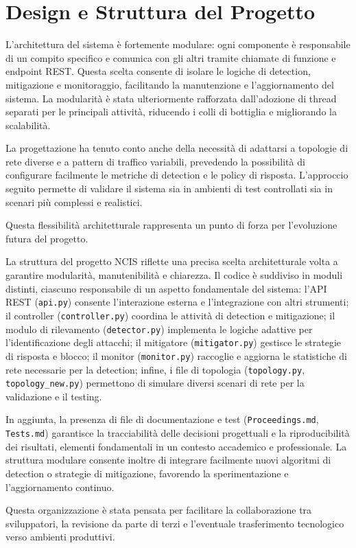 \section{Design e Struttura del Progetto}
L’architettura del sistema è fortemente modulare: ogni componente è responsabile di un compito specifico e comunica con gli altri tramite chiamate di funzione e endpoint REST. Questa scelta consente di isolare le logiche di detection, mitigazione e monitoraggio, facilitando la manutenzione e l’aggiornamento del sistema. La modularità è stata ulteriormente rafforzata dall’adozione di thread separati per le principali attività, riducendo i colli di bottiglia e migliorando la scalabilità.\par
La progettazione ha tenuto conto anche della necessità di adattarsi a topologie di rete diverse e a pattern di traffico variabili, prevedendo la possibilità di configurare facilmente le metriche di detection e le policy di risposta. L’approccio seguito permette di validare il sistema sia in ambienti di test controllati sia in scenari più complessi e realistici.\par
Questa flessibilità architetturale rappresenta un punto di forza per l’evoluzione futura del progetto.

La struttura del progetto NCIS riflette una precisa scelta architetturale volta a garantire modularità, manutenibilità e chiarezza. Il codice è suddiviso in moduli distinti, ciascuno responsabile di un aspetto fondamentale del sistema: l’API REST (\texttt{api.py}) consente l’interazione esterna e l’integrazione con altri strumenti; il controller (\texttt{controller.py}) coordina le attività di detection e mitigazione; il modulo di rilevamento (\texttt{detector.py}) implementa le logiche adattive per l’identificazione degli attacchi; il mitigatore (\texttt{mitigator.py}) gestisce le strategie di risposta e blocco; il monitor (\texttt{monitor.py}) raccoglie e aggiorna le statistiche di rete necessarie per la detection; infine, i file di topologia (\texttt{topology.py}, \texttt{topology\_new.py}) permettono di simulare diversi scenari di rete per la validazione e il testing.\par
In aggiunta, la presenza di file di documentazione e test (\texttt{Proceedings.md}, \texttt{Tests.md}) garantisce la tracciabilità delle decisioni progettuali e la riproducibilità dei risultati, elementi fondamentali in un contesto accademico e professionale. La struttura modulare consente inoltre di integrare facilmente nuovi algoritmi di detection o strategie di mitigazione, favorendo la sperimentazione e l’aggiornamento continuo.\par
Questa organizzazione è stata pensata per facilitare la collaborazione tra sviluppatori, la revisione da parte di terzi e l’eventuale trasferimento tecnologico verso ambienti produttivi.

